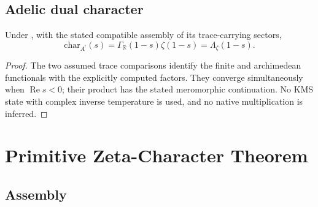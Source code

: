 \subsection{Adelic dual character}
\label{v4-arith:prim-zeta:koszul-dual-adelic}
\begin{theorem}
\label{v4-arith:prim-zeta:thm:koszul-dual-adelic}
Under , with the
stated compatible assembly of its trace-carrying sectors,
\begin{equation}
 \mathrm{char}_{A^!}(s)=\Gamma_{\mathbb R}(1-s)\zeta(1-s)
                     =\Lambda_\zeta(1-s).
 \label{v4-arith:prim-zeta:eq:koszul-dual-adelic}
\end{equation}
\end{theorem}
\begin{proof}
The two assumed trace comparisons identify the finite and archimedean
functionals with the explicitly computed factors. They converge
simultaneously when \(\operatorname{Re}s<0\); their product has the
stated meromorphic continuation. No KMS state with complex inverse
temperature is used, and no native multiplication is inferred.
\end{proof}

\section{Primitive Zeta-Character Theorem}
\label{v4-arith:prim-zeta:main-theorem}

\subsection{Assembly}
\label{v4-arith:prim-zeta:assembly}

